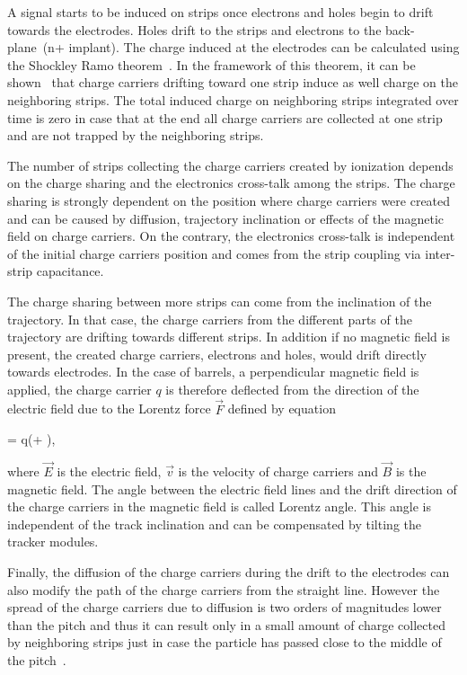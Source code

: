A signal starts to be induced on strips once electrons and holes begin to drift towards the electrodes. Holes drift to the strips and electrons to the back-plane~(n+ implant). The charge induced at the electrodes can be calculated using the Shockley Ramo theorem~\cite{doi:10.1063/1.1710367,Ramo:1939vr}. In the framework of this theorem, it can be shown~\cite{Bloch:2007zza} that charge carriers drifting toward one strip induce as well charge on the neighboring strips. The total induced charge on neighboring strips integrated over time is zero in case that at the end all charge carriers are collected at one strip and are not trapped by the neighboring strips.

The number of strips collecting the charge carriers created by ionization depends on the charge sharing and the electronics cross-talk among the strips. The charge sharing is strongly dependent on the position where charge carriers were created and can be caused by diffusion, trajectory inclination or effects of the magnetic field on charge carriers. On the contrary, the electronics cross-talk is independent of the initial charge carriers position and comes from the strip coupling via inter-strip capacitance.  

The charge sharing between more strips can come from the inclination of the trajectory. In that case, the charge carriers from the different parts of the trajectory are drifting towards different strips. In addition if no magnetic field is present, the created charge carriers, electrons and holes, would drift directly towards electrodes. In the case of barrels, a perpendicular magnetic field is applied, the charge carrier $q$ is therefore deflected from the direction of the electric field due to the Lorentz force $\vec{F}$ defined by equation

{
   =  q(+ \times {}),
}

where $\vec{E}$ is the electric field, $\vec{v}$ is the velocity of charge carriers and $\vec{B}$ is the magnetic field. The angle between the electric field lines and the drift direction of the charge carriers in the magnetic field is called Lorentz angle. This angle is independent of the track inclination and can be compensated by tilting the tracker modules.

Finally, the diffusion of the charge carriers during the drift to the electrodes can also modify the path of the charge carriers from the straight line. However the spread of the charge carriers due to diffusion is two orders of magnitudes lower than the pitch and thus it can result only in a small amount of charge collected by neighboring strips just in case the particle has passed close to the middle of the pitch~\cite{Bloch:2007zza}.


